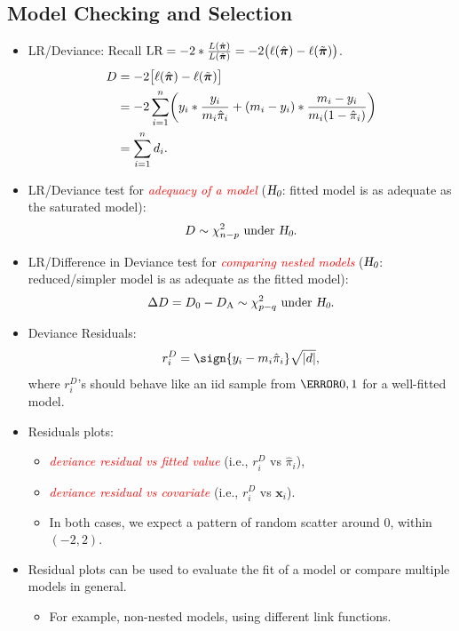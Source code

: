 \documentclass{article}\usepackage[]{graphicx}\usepackage[svgnames]{xcolor}
\let\log\relax%
\newcommand{\HN}{\textsl{H}_{\textsl{0}}}%
\DeclarePairedDelimiter\abs{\lvert}{\rvert}
\providecommand{\Vector}[1]{\bm{#1}}%
\begin{document}
\subsection*{Model Checking and Selection}
\begin{itemize}
      \item LR/Deviance: Recall $ \text{LR}=-2\log*{\frac{L(\hat{\Vector{\pi}})}{L(\tilde{\Vector{\pi}})}}=
                  -2\bigl(\ell(\hat{\Vector{\pi}})-\ell(\tilde{\Vector{\pi}})\bigr) $.
            \begin{align*}
                  D
                   & =-2\bigl[\ell(\hat{\Vector{\pi}})-\ell(\tilde{\Vector{\pi}})\bigr]                                                        \\
                   & =-2 \sum_{i=1}^{n} \biggl(y_i\log*{\frac{y_i}{m_i\hat{\pi}_i}}+(m_i-y_i)\log*{\frac{m_i-y_i}{m_i(1-\hat{\pi}_i)} }\biggr) \\
                   & =\sum_{i=1}^{n} d_i.
            \end{align*}
      \item LR/Deviance test for \textcolor{Red}{\emph{adequacy of a model}} ($ \HN $: fitted model is as adequate as the saturated model):
            \[ D \sim \chi^2_{n-p}\text{ under $\HN$}. \]
      \item LR/Difference in Deviance test for \textcolor{Red}{\emph{comparing nested models}} ($ \HN $: reduced/simpler model is as adequate as the fitted model):
            \[ \Delta D=D_0-D_\text{A} \sim \chi^2_{p-q}\text{ under $ \HN $}. \]
      \item Deviance Residuals:
            \[ r_i^D = \sign{y_i-m_i\hat{\pi}_i}\sqrt{\abs{d}}, \]
            where $ r_i^D $'s should behave like an iid sample from $ \N{0,1} $ for a well-fitted model.
      \item Residuals plots:
            \begin{itemize}
                  \item \textcolor{Red}{\emph{deviance residual vs fitted value}} (i.e., $ r_i^D $ vs $ \hat{\pi}_i $),
                  \item \textcolor{Red}{\emph{deviance residual vs covariate}} (i.e., $ r_i^D $ vs $ \Vector{x}_i $).
                  \item In both cases, we expect a pattern of random scatter around $ 0 $, within $ (-2,2) $.
            \end{itemize}
      \item Residual plots can be used to evaluate the fit of a model or compare multiple models in general.
            \begin{itemize}
                  \item For example, non-nested models, using different link functions.
            \end{itemize}
\end{itemize}
\end{document}
